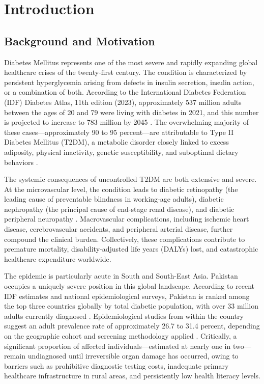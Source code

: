 \documentclass[12pt,a4paper]{report}
\begin{document}
\clearpage
{}

\chapter{Introduction}

\section{Background and Motivation}
Diabetes Mellitus represents one of the most severe and rapidly expanding global healthcare crises of the twenty-first century. The condition is characterized by persistent hyperglycemia arising from defects in insulin secretion, insulin action, or a combination of both. According to the International Diabetes Federation (IDF) Diabetes Atlas, 11th edition (2023), approximately 537 million adults between the ages of 20 and 79 were living with diabetes in 2021, and this number is projected to increase to 783 million by 2045 \cite{idf_atlas_2021}. The overwhelming majority of these cases---approximately 90 to 95 percent---are attributable to Type II Diabetes Mellitus (T2DM), a metabolic disorder closely linked to excess adiposity, physical inactivity, genetic susceptibility, and suboptimal dietary behaviors \cite{who_global_report}.

The systemic consequences of uncontrolled T2DM are both extensive and severe. At the microvascular level, the condition leads to diabetic retinopathy (the leading cause of preventable blindness in working-age adults), diabetic nephropathy (the principal cause of end-stage renal disease), and diabetic peripheral neuropathy \cite{cho_idf_proj}. Macrovascular complications, including ischemic heart disease, cerebrovascular accidents, and peripheral arterial disease, further compound the clinical burden. Collectively, these complications contribute to premature mortality, disability-adjusted life years (DALYs) lost, and catastrophic healthcare expenditure worldwide.

The epidemic is particularly acute in South and South-East Asia. Pakistan occupies a uniquely severe position in this global landscape. According to recent IDF estimates and national epidemiological surveys, Pakistan is ranked among the top three countries globally by total diabetic population, with over 33 million adults currently diagnosed \cite{jpma_pak_diabetes}. Epidemiological studies from within the country suggest an adult prevalence rate of approximately 26.7 to 31.4 percent, depending on the geographic cohort and screening methodology applied \cite{ndi_pak_report}. Critically, a significant proportion of affected individuals---estimated at nearly one in two---remain undiagnosed until irreversible organ damage has occurred, owing to barriers such as prohibitive diagnostic testing costs, inadequate primary healthcare infrastructure in rural areas, and persistently low health literacy levels.
\end{document}

